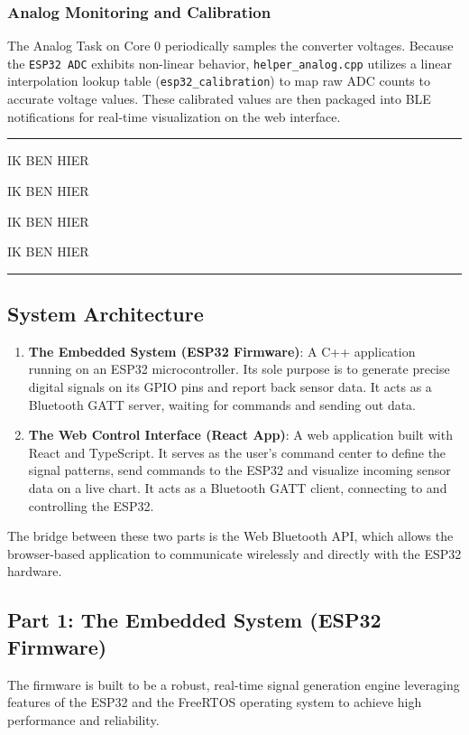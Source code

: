 \subsubsection{Analog Monitoring and Calibration}

The Analog Task on Core 0 periodically samples the converter voltages. Because the \verb|ESP32 ADC| 
exhibits non-linear behavior, \verb|helper_analog.cpp| utilizes a linear interpolation lookup table 
(\verb|esp32_calibration|) to map raw ADC counts to accurate voltage values. These calibrated 
values are then packaged into BLE notifications for real-time visualization on the web interface.

\vspace{10pt}
\hrule
\vspace{10pt}

IK BEN HIER

IK BEN HIER

IK BEN HIER

IK BEN HIER

\vspace{10pt}
\hrule
\vspace{10pt}


\subsection{System Architecture}

\begin{enumerate}
    \item \textbf{The Embedded System (ESP32 Firmware)}: A C++ application running on an ESP32 microcontroller. Its sole
          purpose is to generate precise digital signals on its GPIO pins and report back sensor data. It acts as a Bluetooth
          GATT server, waiting for commands and sending out data.
    \item \textbf{The Web Control Interface (React App)}: A web application built with React and TypeScript. It serves as
          the user's command center to define the signal patterns, send commands to the ESP32 and visualize incoming sensor
          data on a live chart. It acts as a Bluetooth GATT client, connecting to and controlling the ESP32.
\end{enumerate}

The bridge between these two parts is the Web Bluetooth API, which allows the browser-based application to communicate
wirelessly and directly with the ESP32 hardware.

\subsection{Part 1: The Embedded System (ESP32 Firmware)}
The firmware is built to be a robust, real-time signal generation engine leveraging features of the ESP32
and the FreeRTOS operating system to achieve high performance and reliability.


